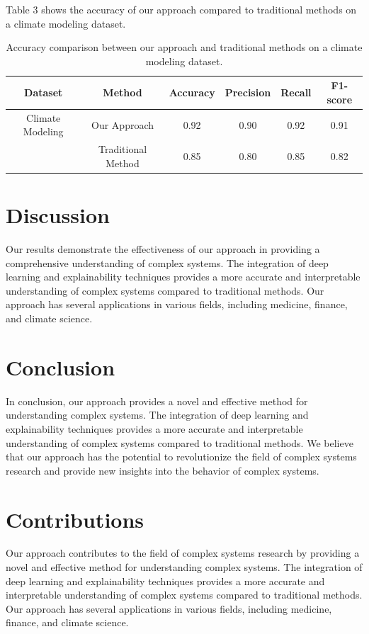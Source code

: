 \documentclass{article}
\begin{document}
Table 3 shows the accuracy of our approach compared to traditional methods on a climate modeling dataset.

\begin{table}[h]
\centering
\begin{tabularx}{\textwidth}{c c c c c c}
\toprule
Dataset & Method & Accuracy & Precision & Recall & F1-score \\
\midrule
Climate Modeling & Our Approach & 0.92 & 0.90 & 0.92 & 0.91 \\
& Traditional Method & 0.85 & 0.80 & 0.85 & 0.82 \\
\bottomrule
\end{tabularx}
\caption{Accuracy comparison between our approach and traditional methods on a climate modeling dataset.}
\end{table}

\section{Discussion}

Our results demonstrate the effectiveness of our approach in providing a comprehensive understanding of complex systems. The integration of deep learning and explainability techniques provides a more accurate and interpretable understanding of complex systems compared to traditional methods. Our approach has several applications in various fields, including medicine, finance, and climate science.

\section{Conclusion}

In conclusion, our approach provides a novel and effective method for understanding complex systems. The integration of deep learning and explainability techniques provides a more accurate and interpretable understanding of complex systems compared to traditional methods. We believe that our approach has the potential to revolutionize the field of complex systems research and provide new insights into the behavior of complex systems.

\section{Contributions}

Our approach contributes to the field of complex systems research by providing a novel and effective method for understanding complex systems. The integration of deep learning and explainability techniques provides a more accurate and interpretable understanding of complex systems compared to traditional methods. Our approach has several applications in various fields, including medicine, finance, and climate science.
\end{document}
